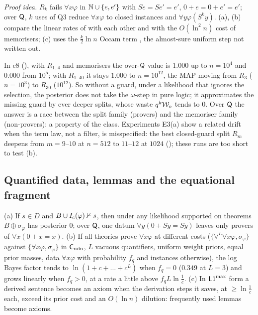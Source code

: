 \noindent\emph{Proof idea.} $R_k$ fails $\forall x\varphi$ in $\mathbb{N}\cup\{e,e'\}$ with $Se=Se'=e'$, $0+e=0+e'=e'$; over $\mathsf{Q}$, $k$ uses of Q3 reduce $\forall x\varphi$ to closed instances and $\forall y\varphi(S^ky)$. (a), (b) compare the linear rates of  with each other and with the $O(\ln^2n)$ cost of memorisers; (c) uses the $\frac k2\ln n$ Occam term \citep{schwarz1978estimating,clarke1990information}, the almost-sure uniform step not written out.

In c8 (), with $R_{1..4}$ and memorisers the over-$\mathsf{Q}$ value is $1.000$ up to $n=10^4$ and $0.000$ from $10^5$; with $R_{1..40}$ it stays $1.000$ to $n=10^{12}$, the MAP moving from $R_3$ ($n=10^3$) to $R_{30}$ ($10^{12}$). So without a guard, under a likelihood that ignores the selection, the posterior does not take the $\omega$-step in pure logic; it approximates the missing guard by ever deeper splits, whose waste $q^k\mathcal{W}_{\mathrm{o}}$ tends to $0$. Over $\mathsf{Q}$ the answer is a race between the split family (provers) and the memoriser family (non-provers): a property of the class. Experiments E3(a) show a related drift when the term law, not a filter, is misspecified: the best closed-guard split $R_m$ deepens from $m=9$--$10$ at $n=512$ to $11$--$12$ at $1024$ (); these runs are too short to test (b).

\subsection{Quantified data, lemmas and the equational fragment}\label{sec:univ:quant}

\begin{proposition}\label{prop:univ:quant}
\textup{(a)} If $s\in D$ and $B\cup I_{\mathrm{c}}(\varphi)\nvdash s$, then under any likelihood supported on theorems $B\oplus\sigma_\varphi$ has posterior $0$; over $\mathsf{Q}$, one datum $\forall y(0+Sy=Sy)$ leaves only provers of $\forall x(0+x=x)$. \textup{(b)} If all theories prove $\forall x\varphi$ at different costs ($\{\forall^L\forall x\varphi,\sigma_\varphi\}$ against $\{\forall x\varphi,\sigma_\varphi\}$ in $\mathsf{C}_{\min}$, $L$ vacuous quantifiers, uniform weight priors, equal prior masses, data $\forall x\varphi$ with probability $f_q$ and instances otherwise), the log Bayes factor tends to $\ln(1+c+\dots+c^L)$ when $f_q=0$ ($0.349$ at $L=3$) and grows linearly when $f_q>0$, at a rate a little above $f_qL\ln\frac1c$. \textup{(c)} In $\mathord{\mathsf{L1}}^{\max}$ form a derived sentence becomes an axiom when the derivation steps it saves, at $\ge\ln\frac1c$ each, exceed its prior cost and an $O(\ln n)$ dilution: frequently used lemmas become axioms.
\end{proposition}

